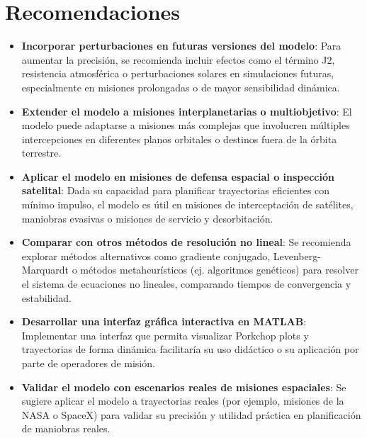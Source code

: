 \section{Recomendaciones}
\begin{itemize}
    \item \textbf{Incorporar perturbaciones en futuras versiones del modelo}: Para aumentar la
          precisión, se recomienda incluir efectos como el término J2, resistencia
          atmosférica o perturbaciones solares en simulaciones futuras, especialmente en
          misiones prolongadas o de mayor sensibilidad dinámica.
    \item \textbf{Extender el modelo a misiones interplanetarias o multiobjetivo}: El modelo puede adaptarse a misiones más complejas que involucren múltiples intercepciones en diferentes planos orbitales o destinos fuera de la órbita terrestre.
    \item \textbf{Aplicar el modelo en misiones de defensa espacial o inspección satelital}: Dada su capacidad para planificar trayectorias eficientes con mínimo impulso, el modelo es útil en misiones de interceptación de satélites, maniobras evasivas o misiones de servicio y desorbitación.
    \item \textbf{Comparar con otros métodos de resolución no lineal}: Se recomienda explorar métodos alternativos como gradiente conjugado, Levenberg-Marquardt o métodos metaheurísticos (ej. algoritmos genéticos) para resolver el sistema de ecuaciones no lineales, comparando tiempos de convergencia y estabilidad.
    \item \textbf{Desarrollar una interfaz gráfica interactiva en MATLAB}: Implementar una interfaz que permita visualizar Porkchop plots y trayectorias de forma dinámica facilitaría su uso didáctico o su aplicación por parte de operadores de misión.
    \item \textbf{Validar el modelo con escenarios reales de misiones espaciales}: Se sugiere aplicar el modelo a trayectorias reales (por ejemplo, misiones de la NASA o SpaceX) para validar su precisión y utilidad práctica en planificación de maniobras reales.
\end{itemize}
